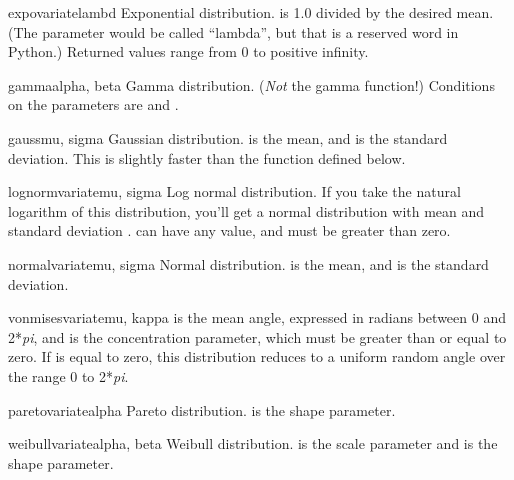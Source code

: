 \begin{funcdesc}{expovariate}{lambd}
  Exponential distribution.   is 1.0 divided by the desired
  mean.  (The parameter would be called ``lambda'', but that is a
  reserved word in Python.)  Returned values range from 0 to
  positive infinity.
\end{funcdesc}

\begin{funcdesc}{gamma}{alpha, beta}
  Gamma distribution.  (\emph{Not} the gamma function!)  Conditions on
  the parameters are  and .
\end{funcdesc}

\begin{funcdesc}{gauss}{mu, sigma}
  Gaussian distribution.   is the mean, and  is the
  standard deviation.  This is slightly faster than the
   function defined below.
\end{funcdesc}

\begin{funcdesc}{lognormvariate}{mu, sigma}
  Log normal distribution.  If you take the natural logarithm of this
  distribution, you'll get a normal distribution with mean 
  and standard deviation .   can have any value,
  and  must be greater than zero.
\end{funcdesc}

\begin{funcdesc}{normalvariate}{mu, sigma}
  Normal distribution.   is the mean, and  is the
  standard deviation.
\end{funcdesc}

\begin{funcdesc}{vonmisesvariate}{mu, kappa}
   is the mean angle, expressed in radians between 0 and
  2*\emph{pi}, and  is the concentration parameter, which
  must be greater than or equal to zero.  If  is equal to
  zero, this distribution reduces to a uniform random angle over the
  range 0 to 2*\emph{pi}.
\end{funcdesc}

\begin{funcdesc}{paretovariate}{alpha}
  Pareto distribution.   is the shape parameter.
\end{funcdesc}

\begin{funcdesc}{weibullvariate}{alpha, beta}
  Weibull distribution.   is the scale parameter and
   is the shape parameter.
\end{funcdesc}


\begin{seealso}
\end{seealso}
